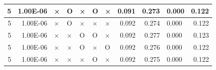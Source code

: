 \documentclass[11pt]{article}
\begin{document}
\begin{longtable}[h]{|r|r|l|l|l|l|l|r|r|l|r|}
5                                 & 1.00E-06                         & ×                                & O                                & ×                                & O                                & ×                                 & 0.091                             & 0.273                             & 0.000                              & 0.122                               \\ \hline
5                                 & 1.00E-06                         & ×                                & O                                & ×                                & ×                                & ×                                 & 0.092                             & 0.274                             & 0.000                              & 0.122                               \\ \hline
5                                 & 1.00E-06                         & ×                                & ×                                & O                                & O                                & ×                                 & 0.092                             & 0.277                             & 0.000                              & 0.123                               \\ \hline
5                                 & 1.00E-06                         & ×                                & ×                                & O                                & ×                                & O                                 & 0.092                             & 0.276                             & 0.000                              & 0.122                               \\ \hline
5                                 & 1.00E-06                         & ×                                & ×                                & ×                                & O                                & ×                                 & 0.092                             & 0.275                             & 0.000                              & 0.122                               \\ \hline



\end{longtable}
\end{document}

